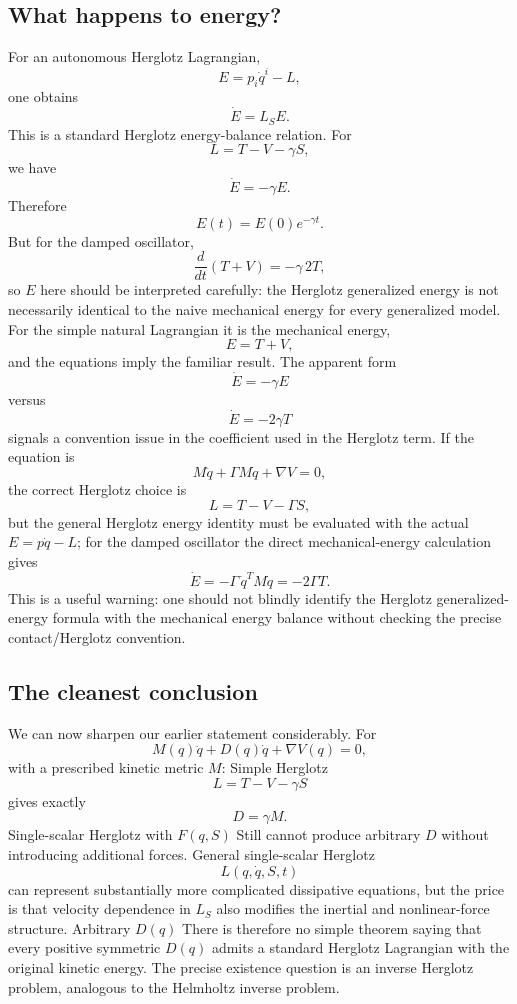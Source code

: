 \subsection{What happens to energy?}

For an autonomous Herglotz Lagrangian,
$$ E=p_i\dot q^i-L, $$
one obtains
\begin{equation}
 \boxed{ \dot E=L_SE. } \tag{15} 
\end{equation}
This is a standard Herglotz energy-balance relation.
For
$$ L=T-V-\gamma S, $$
we have
$$ \dot E=-\gamma E. $$
Therefore
$$ E(t)=E(0)e^{-\gamma t}. $$
But for the damped oscillator,
$$ \frac{d}{dt}(T+V) = -\gamma\,2T, $$
so \(E\) here should be interpreted carefully: the Herglotz generalized energy is not necessarily identical to the naive mechanical energy for every generalized model.
For the simple natural Lagrangian it is the mechanical energy,
$$ E=T+V, $$
and the equations imply the familiar result. The apparent form
$$ \dot E=-\gamma E $$
versus
$$ \dot E=-2\gamma T $$
signals a convention issue in the coefficient used in the Herglotz term. If the equation is
$$ M\ddot q+\Gamma M\dot q+\nabla V=0, $$
the correct Herglotz choice is
$$ L=T-V-\Gamma S, $$
but the general Herglotz energy identity must be evaluated with the actual \(E=p\dot q-L\); for the damped oscillator the direct mechanical-energy calculation gives
$$ \boxed{\dot E=-\Gamma\,\dot q^TM\dot q=-2\Gamma T.} $$
This is a useful warning: one should not blindly identify the Herglotz generalized-energy formula with the mechanical energy balance without checking the precise contact/Herglotz convention.

\subsection{The cleanest conclusion}

We can now sharpen our earlier statement considerably.
For
$$ \boxed{ M(q)\ddot q+D(q)\dot q+\nabla V(q)=0, } $$
with a prescribed kinetic metric \(M\):
Simple Herglotz
$$ \boxed{ L=T-V-\gamma S } $$
gives exactly
$$ \boxed{ D=\gamma M. } $$
Single-scalar Herglotz with \(F(q,S)\)
Still cannot produce arbitrary \(D\) without introducing additional forces.
General single-scalar Herglotz
$$ L(q,\dot q,S,t) $$
can represent substantially more complicated dissipative equations, but the price is that velocity dependence in \(L_S\) also modifies the inertial and nonlinear-force structure.
Arbitrary \(D(q)\)
There is therefore no simple theorem saying that every positive symmetric \(D(q)\) admits a standard Herglotz Lagrangian with the original kinetic energy.
The precise existence question is an inverse Herglotz problem, analogous to the Helmholtz inverse problem.

